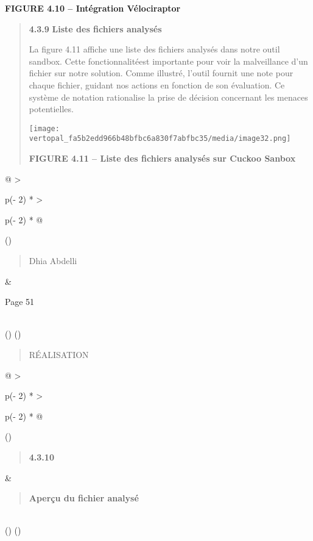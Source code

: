 \documentclass[
]{article}
\begin{document}
\textbf{FIGURE 4.10 -- Intégration Vélociraptor}

\begin{quote}
\textbf{4.3.9} \textbf{Liste des fichiers analysés}

La figure 4.11 affiche une liste des fichiers analysés dans notre outil
sandbox. Cette fonctionnalitéest importante pour voir la malveillance
d'un fichier sur notre solution. Comme illustré, l'outil fournit une
note pour chaque fichier, guidant nos actions en fonction de son
évaluation. Ce système de notation rationalise la prise de décision
concernant les menaces potentielles.

\texttt{[image: vertopal\_fa5b2edd966b48bfbc6a830f7abfbc35/media/image32.png]}

\textbf{FIGURE 4.11 -- Liste des fichiers analysés sur Cuckoo Sanbox}
\end{quote}

\begin{longtable}[]{@{}
  >{\raggedright\arraybackslash}p{(\columnwidth - 2\tabcolsep) * }
  >{\raggedright\arraybackslash}p{(\columnwidth - 2\tabcolsep) * }@{}}
\toprule()
\begin{minipage}[b]{\linewidth}\raggedright
\begin{quote}
Dhia Abdelli
\end{quote}
\end{minipage} & \begin{minipage}[b]{\linewidth}\raggedright
Page 51
\end{minipage} \\
\midrule()
\endhead
\bottomrule()
\end{longtable}

\begin{quote}
RÉALISATION
\end{quote}

\begin{longtable}[]{@{}
  >{\raggedright\arraybackslash}p{(\columnwidth - 2\tabcolsep) * }
  >{\raggedright\arraybackslash}p{(\columnwidth - 2\tabcolsep) * }@{}}
\toprule()
\begin{minipage}[b]{\linewidth}\raggedright
\begin{quote}
\textbf{4.3.10}
\end{quote}
\end{minipage} & \begin{minipage}[b]{\linewidth}\raggedright
\begin{quote}
\textbf{Aperçu du fichier analysé}
\end{quote}
\end{minipage} \\
\midrule()
\endhead
\bottomrule()
\end{longtable}
\end{document}
